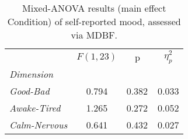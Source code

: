 \begin{table}[h]
\centering
\caption{Mixed-ANOVA results (main effect Condition) of self-reported mood, assessed via MDBF.}
\label{tab:tab_questionnaire_mdbf_main_effect_condition}

\begin{tabular}{l||SSS}
\toprule
{} & {$F(1, 23)$} &         {p} & {$\eta^2_p$} \\
\textit{Dimension}    &              &             &              \\
\midrule
\textit{Good-Bad}     &        0.794 &  0.382$^{}$ &        0.033 \\
\textit{Awake-Tired}  &        1.265 &  0.272$^{}$ &        0.052 \\
\textit{Calm-Nervous} &        0.641 &  0.432$^{}$ &        0.027 \\
\bottomrule
\end{tabular}
\end{table}
